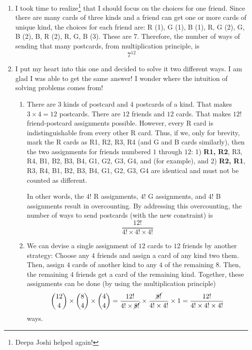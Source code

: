 \documentclass[11pt]{book}
\theoremstyle{definition}
\theoremstyle{plain}
\theoremstyle{definition}
\theoremstyle{problemstyle}
\theoremstyle{remark}
\theoremstyle{definition}
\newtheorem{reflection}{Reflection}
\begin{document}
\begin{enumerate}[label=(\alph*)]
\begin{reflection}[All Textbook Combinatorial Problems are Word-problems]
                I soon realized that I solved the problem the hard way.

                Deepa Joshi heard the problem and said, ``Well, it's $3^{12}$, because every friend can receive an R, G, or B card and there are $12$ friends. Use the multiplication principle!'' I wonder why it did not occur to me!
            \end{reflection}

        \item I took time to realize\footnote{Deepa Joshi helped again!} that I should focus on the choices for one friend. Since there are many cards of three kinds and a friend can get one or more cards of unique kind, the choices for each friend are: R (1), G (1), B (1), R, G (2), G, B (2), B, R (2), R, G, B (3). These are $7$. Therefore, the number of ways of sending that many postcards, from multiplication principle, is
            \[
                7^{12}
            \]

        \item I put my heart into this one and decided to solve it two different ways. I am glad I was able to get the same answer! I wonder where the intuition of solving problems comes from!
            \begin{enumerate}[label=\arabic*)]
                \item There are 3 kinds of postcard and 4 postcards of a kind. That makes $3\times4=12$ postcards. There are $12$ friends and $12$ cards. That makes $12!$ friend-postcard assignments possible. However, every R card is indistinguishable from every other R card. Thus, if we, only for brevity, mark the R cards as R1, R2, R3, R4 (and G and B cards similarly), then the two assignments for friends numbered $1$ through $12$: 1) \textbf{R1, R2}, R3, R4, B1, B2, B3, B4, G1, G2, G3, G4, and (for example), and 2) \textbf{R2, R1}, R3, R4, B1, B2, B3, B4, G1, G2, G3, G4 are identical and must not be counted as different.

                    In other words, the $4!$ R assignments, $4!$ G assignments, and $4!$ B assignments result in overcounting. By addressing this overcounting, the number of ways to send postcards (with the new constraint) is
                    \[
                        \frac{12!}{4!\times4!\times4!}
                    \]
                \item We can devise a single assignment of $12$ cards to $12$ friends by another strategy: Choose any $4$ friends and assign a card of any kind two them. Then, assign $4$ cards of another kind to any $4$ of the remaining $8$. Then, the remaining $4$ friends get a card of the remaining kind. Together, these assignments can be done (by using the multiplication principle)
                    \[
                        \binom{12}{4}\times\binom{8}{4}\times\binom{4}{4}=\frac{12!}{4!\times\cancel{8!}}\times\frac{\cancel{8!}}{4!\times4!}\times1=\frac{12!}{4!\times4!\times4!}
                    \] ways.
            \end{enumerate}
    \end{enumerate}
\end{document}
